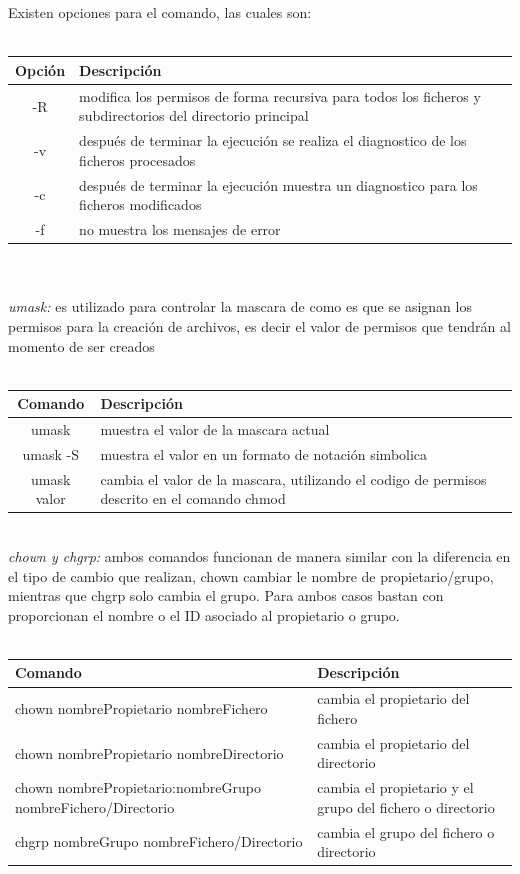 \documentclass[10pt,a4paper,titlepage]{article}
\begin{document}
	\\
	\\
	Existen opciones para el comando, las cuales son:
	\\
	\\
	\begin{tabular}{|c|p{8cm}|}
		\hline
		Opción & Descripción \\
		\hline
		-R & modifica los permisos de forma recursiva para todos los ficheros y subdirectorios del directorio principal \\
		\hline
		-v & después de terminar la ejecución se realiza el diagnostico de los ficheros procesados \\
		\hline
		-c & después de terminar la ejecución muestra un diagnostico para los ficheros modificados \\ 
		\hline
		-f & no muestra los mensajes de error \\
		\hline
	\end{tabular}
	\\
	\\
	\emph{umask:} es utilizado para controlar la mascara de como es que se asignan los permisos para la creación de archivos, es decir el valor de permisos que tendrán al momento de ser creados
	\\
	\\
	\begin{tabular}{|c|p{8cm}|}
		\hline
		Comando & Descripción \\
		\hline
		umask & muestra el valor de la mascara actual \\
		\hline
		umask -S & muestra el valor en un formato de notación simbolica \\
		\hline
		umask valor & cambia el valor de la mascara, utilizando el codigo de permisos descrito en el comando chmod \\
		\hline
	\end{tabular}
	\\
	\emph{chown y chgrp:} ambos comandos funcionan de manera similar con la diferencia en el tipo de cambio que realizan, chown cambiar le nombre de propietario/grupo, mientras que chgrp solo cambia el grupo. Para ambos casos bastan con proporcionan el nombre o el ID asociado al propietario o grupo.
	\\
	\\
	\begin{tabular}{|p{7cm}|p{7cm}|}
		\hline
		Comando & Descripción \\
		\hline
		chown nombrePropietario nombreFichero & cambia el propietario del fichero \\
		\hline
		chown nombrePropietario nombreDirectorio & cambia el propietario del directorio \\
		\hline
		chown nombrePropietario:nombreGrupo nombreFichero/Directorio & cambia el propietario y el grupo del fichero o directorio \\
		\hline
		chgrp nombreGrupo nombreFichero/Directorio & cambia el grupo del fichero o directorio \\
		\hline
	\end{tabular}
	
\end{document}
